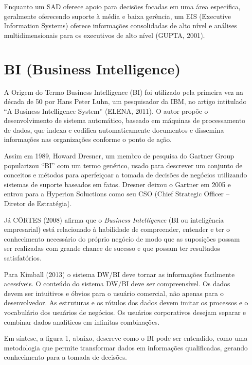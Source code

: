 Enquanto um SAD oferece apoio para decis\~{o}es focadas em uma \'{a}rea espec\'{i}fica, geralmente oferecendo suporte \`{a} m\'{e}dia e baixa gerência, um EIS (Executive Information Systems) oferece informa\c{c}\~{o}es consolidadas de alto n\'{i}vel e an\'{a}lises multidimensionais para os executivos de alto n\'{i}vel (GUPTA, 2001).

\section{BI (Business Intelligence)}

A Origem do Termo Business Intelligence (BI) foi utilizado pela primeira vez na d\'{e}cada de 50 por Hans Peter Luhn, um pesquisador da IBM, no artigo intitulado “A Business Intelligence System” (ELENA, 2011). O autor prop\~{o}e o desenvolvimento de sistema autom\'{a}tico, baseado em m\'{a}quinas de processamento de dados, que indexa e codifica automaticamente documentos e dissemina informa\c{c}\~{o}es nas organiza\c{c}\~{o}es conforme o ponto de a\c{c}\~{a}o.

Assim em 1989, Howard Dresner, um membro de pesquisa do Gartner Group popularizou “BI” com um termo gen\'{e}rico, usado para descrever um conjunto de conceitos e m\'{e}todos para aperfei\c{c}oar a tomada de decis\~{o}es de neg\'{o}cios utilizando sistemas de suporte baseados em fatos. Dresner deixou o Gartner em 2005 e entrou para a Hyperion Soluctions como seu CSO (Chief Strategic Officer – Diretor de Estrat\'{e}gia).

J\'{a} CÔRTES (2008) afirma que o \textit{Business Intelligence} (BI ou intelig\^{e}ncia empresarial) est\'{a} relacionado \`{a} habilidade de compreender, entender e ter o conhecimento necess\'{a}rio do pr\'{o}prio neg\'{o}cio de modo que as suposi\c{c}\~{o}es possam ser realizadas com grande chance de sucesso e que possam ter resultados satisfat\'{o}rios.

Para Kimball (2013) o sistema DW/BI deve tornar as informa\c{c}\~{o}es facilmente acess\'{i}veis. O conteúdo do sistema DW/BI deve ser compreens\'{i}vel. Os dados devem ser intuitivos e \'{o}bvios para o usu\'{a}rio comercial, n\~{a}o apenas para o desenvolvedor. As estruturas e os r\'{o}tulos dos dados devem imitar os processos e o vocabul\'{a}rio dos usu\'{a}rios de neg\'{o}cios. Os usu\'{a}rios corporativos desejam separar e combinar dados anal\'{i}ticos em infinitas combina\c{c}\~{o}es.

Em s\'{i}ntese, a figura 1, abaixo, descreve como o BI pode ser entendido, como uma metodologia que permite transformar dados em informa\c{c}\~{o}es qualificadas, gerando conhecimento para a tomada de decis\~{o}es.

